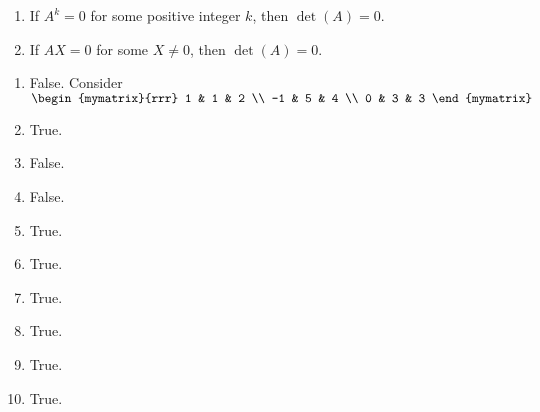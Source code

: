 \begin{enumialphparenastyle}
\begin{ex}
\begin{enumerate}
\item If $A^{k}=0$ for some positive integer $k$, then $\det (
A) =0$.

\item If $AX=0$ for some $X \neq 0$, then $\det (
A) =0$.
\end{enumerate}
\begin{sol}
\begin{enumerate}
\item False. Consider $\begin{mymatrix}{rrr}
1 & 1 & 2 \\
-1 & 5 & 4 \\
0 & 3 & 3
\end{mymatrix} $
\item True.
\item False.
\item False.
\item True.
\item True.
\item True.
\item True.
\item True.
\item True.
\end{enumerate}
\end{sol}
\end{ex}

\end{enumialphparenastyle}
